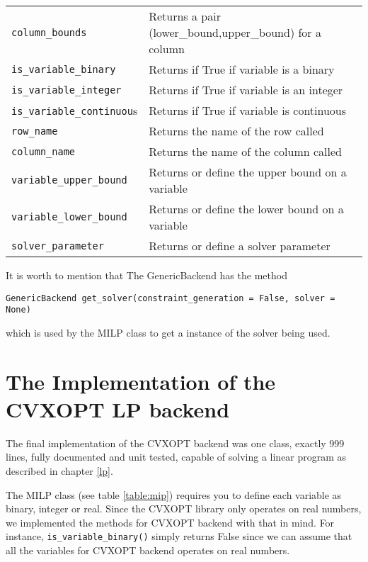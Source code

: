 \begin{table}
\begin{center}
\begin{tabular}{ | l |  l |}
\texttt{column\_bounds}&             Returns a pair (lower\_bound,upper\_bound) for a column\\ 
\texttt{is\_variable\_binary}&       Returns if True if variable is a binary\\  
\texttt{is\_variable\_integer}&      Returns if True if variable is an integer\\ 
\texttt{is\_variable\_continuou}s&   Returns if True if variable is continuous\\  
\texttt{row\_name}&    				 Returns the name of the row called\\
\texttt{column\_name}&    		     Returns the name of the column called\\  
\texttt{variable\_upper\_bound}&     Returns or define the upper bound on a variable\\  
\texttt{variable\_lower\_bound}&     Returns or define the lower bound on a variable\\  
\texttt{solver\_parameter}&          Returns or define a solver parameter\\  
    \hline
  \end{tabular}
\end{center}
\end{table}



It is worth to mention that The GenericBackend has the method
\begin{verbatim}
GenericBackend get_solver(constraint_generation = False, solver = None)
\end{verbatim}
which is used by the MILP class to get a instance of the solver being used.




\section{The Implementation of the CVXOPT LP backend}
The final implementation of the CVXOPT backend was one class, exactly 999 lines, fully documented and unit tested, capable of solving a linear program as described in chapter \ref{lp}. 

The MILP class (see table \ref{table:mip}) requires you to define each variable as binary, integer or real. Since the CVXOPT library only operates on real numbers, we implemented the methods for CVXOPT backend with that in mind. For instance, \texttt{is\_variable\_binary()} simply returns False since we can assume that all the variables for CVXOPT backend operates on real numbers. 


